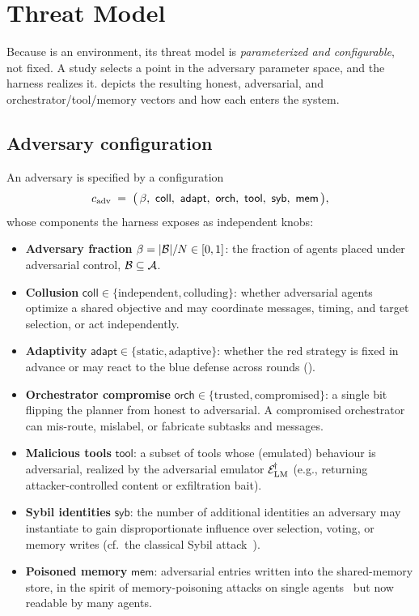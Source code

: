 \section{Threat Model}
\label{sec:threat}

Because  is an environment, its threat model is \emph{parameterized and
configurable}, not fixed. A study selects a point in the adversary parameter space, and
the harness realizes it.  depicts the resulting honest, adversarial,
and orchestrator/tool/memory vectors and how each enters the system.

\subsection{Adversary configuration}
An adversary is specified by a configuration
\begin{equation}
\label{eq:adv-config}
\config_{\mathrm{adv}} \;=\; \bigl(\,\betafrac,\ \mathsf{coll},\ \mathsf{adapt},\
\mathsf{orch},\ \mathsf{tool},\ \mathsf{syb},\ \mathsf{mem}\,\bigr),
\end{equation}
whose components the harness exposes as independent knobs:
\begin{itemize}[leftmargin=1.4em]
\item \textbf{Adversary fraction} $\beta=|\mathcal{B}|/N\in[0,1]$: the fraction of agents
placed under adversarial control, $\mathcal{B}\subseteq\mathcal{A}$.
\item \textbf{Collusion} $\mathsf{coll}\in\{\text{independent},\text{colluding}\}$:
whether adversarial agents optimize a shared objective and may coordinate messages,
timing, and target selection, or act independently.
\item \textbf{Adaptivity} $\mathsf{adapt}\in\{\text{static},\text{adaptive}\}$: whether
the red strategy is fixed in advance or may react to the blue defense across \corb{}
rounds (\Cref{sec:algorithm}).
\item \textbf{Orchestrator compromise} $\mathsf{orch}\in\{\text{trusted},\text{compromised}\}$:
a single bit flipping the planner from honest to adversarial. A compromised orchestrator
can mis-route, mislabel, or fabricate subtasks and messages.
\item \textbf{Malicious tools} $\mathsf{tool}$: a subset of tools whose (emulated)
behaviour is adversarial, realized by the adversarial emulator $\mathcal{E}_{\mathrm{LM}}^{\!\dagger}$
(e.g., returning attacker-controlled content or exfiltration bait).
\item \textbf{Sybil identities} $\mathsf{syb}$: the number of additional identities an
adversary may instantiate to gain disproportionate influence over selection, voting, or
memory writes (cf.\ the classical Sybil attack~\cite{douceur2002sybil}).
\item \textbf{Poisoned memory} $\mathsf{mem}$: adversarial entries written into the
shared-memory store, in the spirit of memory-poisoning attacks on single
agents~\cite{chen2024agentpoison} but now readable by many agents.
\end{itemize}

